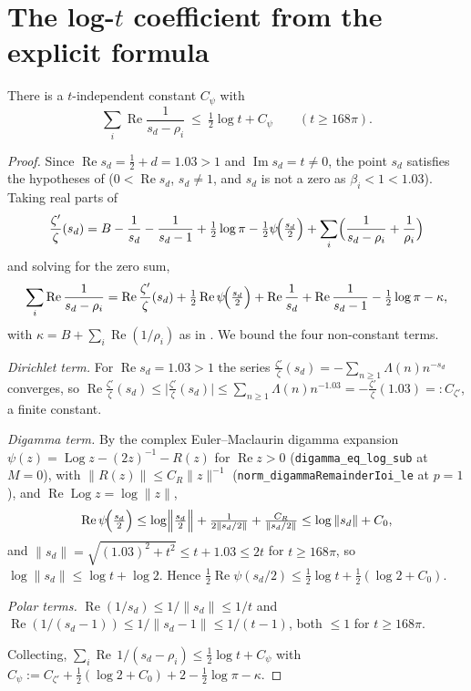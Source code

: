 \section{The log-\texorpdfstring{$t$}{t} coefficient from the explicit formula}
\label{sec:ll_zeta_sum}

\begin{lemma}
\label{lem:ll_zeta_sum}
\leanok
{}
There is a $t$-independent constant $C_\psi$ with
\[
  \sum_i\operatorname{Re}\frac1{s_d-\rho_i}\ \le\ \tfrac12\log t+C_\psi
  \qquad(t\ge168\pi).
\]
\end{lemma}

\begin{proof}
\leanok
{}
Since $\operatorname{Re}s_d=\tfrac12+d=1.03>1$ and $\operatorname{Im}s_d=t\neq0$, the
point $s_d$ satisfies the hypotheses of 
($0<\operatorname{Re}s_d$, $s_d\neq1$, and $s_d$ is not a zero as $\beta_i<1<1.03$).
Taking real parts of
\[
  \frac{\zeta'}\zeta(s_d)=B-\frac1{s_d}-\frac1{s_d-1}+\tfrac12\log\pi
    -\tfrac12\psi\!\Bigl(\tfrac{s_d}2\Bigr)
    +\sum_i\Bigl(\frac1{s_d-\rho_i}+\frac1{\rho_i}\Bigr)
\]
and solving for the zero sum,
\[
  \sum_i\operatorname{Re}\frac1{s_d-\rho_i}
  =\operatorname{Re}\frac{\zeta'}\zeta(s_d)+\tfrac12\operatorname{Re}\psi\!\Bigl(\tfrac{s_d}2\Bigr)
   +\operatorname{Re}\frac1{s_d}+\operatorname{Re}\frac1{s_d-1}-\tfrac12\log\pi-\kappa,
\]
with $\kappa=B+\sum_i\operatorname{Re}(1/\rho_i)$ as in . We bound
the four non-constant terms.

\emph{Dirichlet term.} For $\operatorname{Re}s_d=1.03>1$ the series
$\tfrac{\zeta'}\zeta(s_d)=-\sum_{n\ge1}\Lambda(n)n^{-s_d}$ converges, so
$\operatorname{Re}\tfrac{\zeta'}\zeta(s_d)\le\bigl|\tfrac{\zeta'}\zeta(s_d)\bigr|
\le\sum_{n\ge1}\Lambda(n)n^{-1.03}=-\tfrac{\zeta'}\zeta(1.03)=:C_{\zeta'}$, a finite
constant.

\emph{Digamma term.} By the complex Euler--Maclaurin digamma expansion
$\psi(z)=\operatorname{Log}z-(2z)^{-1}-R(z)$ for $\operatorname{Re}z>0$
(\texttt{digamma\_eq\_log\_sub} at $M=0$), with
$\|R(z)\|\le C_R\|z\|^{-1}$ (\texttt{norm\_digammaRemainderIoi\_le} at $p=1$), and
$\operatorname{Re}\operatorname{Log}z=\log\|z\|$,
\[
  \operatorname{Re}\psi\!\Bigl(\tfrac{s_d}2\Bigr)\le\log\Bigl\|\tfrac{s_d}2\Bigr\|
    +\tfrac1{2\|s_d/2\|}+\tfrac{C_R}{\|s_d/2\|}
  \le\log\|s_d\|+C_0,
\]
and $\|s_d\|=\sqrt{(1.03)^2+t^2}\le t+1.03\le 2t$ for $t\ge168\pi$, so
$\log\|s_d\|\le\log t+\log2$. Hence $\tfrac12\operatorname{Re}\psi(s_d/2)\le
\tfrac12\log t+\tfrac12(\log2+C_0)$.

\emph{Polar terms.} $\operatorname{Re}(1/s_d)\le1/\|s_d\|\le1/t$ and
$\operatorname{Re}(1/(s_d-1))\le1/\|s_d-1\|\le1/(t-1)$, both $\le1$ for $t\ge168\pi$.

Collecting, $\sum_i\operatorname{Re}\,1/(s_d-\rho_i)\le\tfrac12\log t+C_\psi$ with
$C_\psi:=C_{\zeta'}+\tfrac12(\log2+C_0)+2-\tfrac12\log\pi-\kappa$.
\end{proof}

